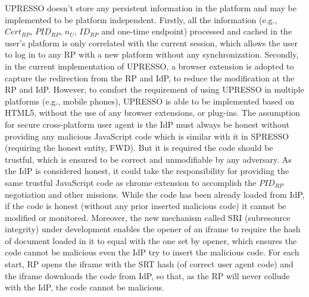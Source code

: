  UPRESSO doesn't store any persistent information in the platform and may be implemented to be platform independent. Firstly, all the information (e.g., $Cert_{RP}$, $PID_{RP}$, $n_U$, $ID_{RP}$ and one-time endpoint) processed and cached in the user's platform is only correlated with the current session, which allows the user to log in to any RP with a new platform without any synchronization. Secondly, in the current implementation of UPRESSO, a browser extension is adopted to capture the redirection from the RP and IdP, to reduce the modification at the RP and IdP.
However, to comfort the requirement of using UPRESSO in multiple platforms (e.g., mobile phones), UPRESSO is able to be implemented based on HTML5, without the use of any browser extensions, or plug-ins. The assumption for secure cross-platform user agent is the IdP must always be honest without providing any malicious JavaScript code which is similar with it in SPRESSO (requiring the honest entity, FWD). But it is required the code should be trustful, which is ensured to be correct and unmodifiable by any adversary. As the IdP is considered honest, it could take the responsibility for providing the same trustful JavaScript code as chrome extension to accomplish the $PID_{RP}$ negotiation and other missions. While the code has been already loaded from IdP, if the code is honest (without any prior inserted malicious code) it cannot be modified or monitored. Moreover, the new mechanism called SRI (subresource integrity) under development enables the opener of an iframe to require the hash of document loaded in it to equal with the one set by opener, which ensures the code cannot be malicious even the IdP try to insert the malicious code. For each start, RP opens the iframe with the SRT hash (of correct user agent code) and the iframe downloads the code from IdP, so that, as the RP will never collude with the IdP, the code cannot be malicious.

